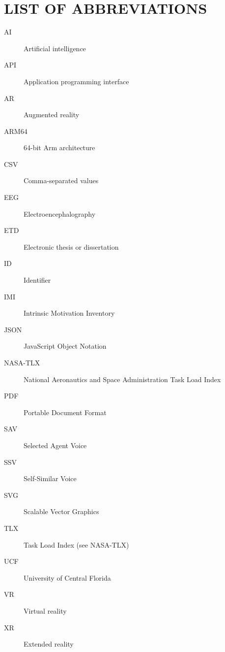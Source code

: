 \chapter*{LIST OF ABBREVIATIONS}
{}

\begingroup
\singlespacing
\begin{description}
\item[AI] Artificial intelligence
\item[API] Application programming interface
\item[AR] Augmented reality
\item[ARM64] 64-bit Arm architecture
\item[CSV] Comma-separated values
\item[EEG] Electroencephalography
\item[ETD] Electronic thesis or dissertation
\item[ID] Identifier
\item[IMI] Intrinsic Motivation Inventory
\item[JSON] JavaScript Object Notation
\item[NASA-TLX] National Aeronautics and Space Administration Task Load Index
\item[PDF] Portable Document Format
\item[SAV] Selected Agent Voice
\item[SSV] Self-Similar Voice
\item[SVG] Scalable Vector Graphics
\item[TLX] Task Load Index (see NASA-TLX)
\item[UCF] University of Central Florida
\item[VR] Virtual reality
\item[XR] Extended reality
\end{description}
\endgroup
